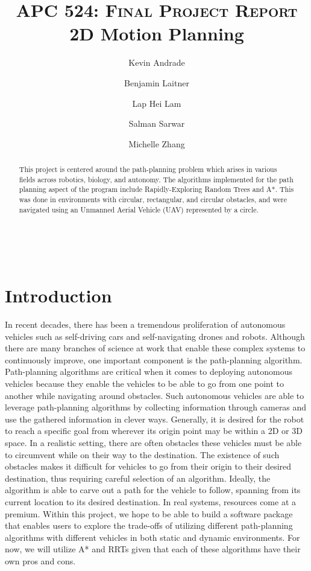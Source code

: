 \documentclass[10pt,letterpaper]{article}
\title{
		\usefont{OT1}{bch}{b}{n}
		\normalfont \normalsize \textsc{APC 524: Final Project Report} \\ [10pt]
		\huge 2D Motion Planning \\
}
\author[1]{Kevin Andrade}
\author[2]{Benjamin Laitner}
\author[3]{Lap Hei Lam}
\author[4]{Salman Sarwar}
\author[5]{Michelle Zhang}
\affil[]{Princeton University}
\begin{document}
\maketitle

\begin{abstract}
\noindent This project is centered around the path-planning problem which arises in various fields across robotics, biology, and autonomy. The algorithms implemented for the path planning aspect of the program include Rapidly-Exploring Random Trees and A*. This was done in environments with circular, rectangular, and circular obstacles, and were navigated using an Unmanned Aerial Vehicle (UAV) represented by a circle. 
\end{abstract} \\ 

\tableofcontents
\newpage


\section{Introduction}

In recent decades, there has been a tremendous proliferation of autonomous vehicles such as self-driving cars and self-navigating drones and robots. Although there are many branches of science at work that enable these complex systems to continuously improve, one important component is the path-planning algorithm. Path-planning algorithms are critical when it comes to deploying autonomous vehicles because they enable the vehicles to be able to go from one point to another while navigating around obstacles. Such autonomous vehicles are able to leverage path-planning algorithms by collecting information through cameras and use the gathered information in clever ways. 
Generally, it is desired for the robot to reach a specific goal from wherever its origin point may be within a 2D or 3D space. In a realistic setting, there are often obstacles these vehicles must be able to circumvent while on their way to the destination. The existence of such obstacles makes it difficult for vehicles to go from their origin to their desired destination, thus requiring careful selection of an algorithm. Ideally, the algorithm is able to carve out a path for the vehicle to follow, spanning from its current location to its desired destination.
In real systems, resources come at a premium. Within this project, we hope to be able to build a software package that enables users to explore the trade-offs of utilizing different path-planning algorithms with different vehicles in both static and dynamic environments. For now, we will utilize A* and RRTs given that each of these algorithms have their own pros and cons.
\end{document}
